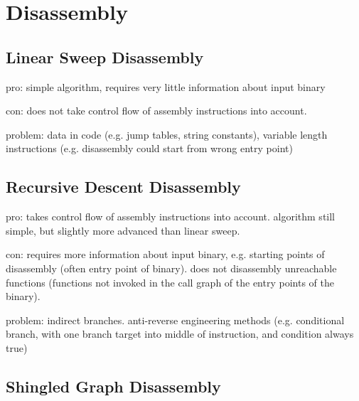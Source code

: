 

\section{Disassembly}


\subsection{Linear Sweep Disassembly}

pro: simple algorithm, requires very little information about input binary

con: does not take control flow of assembly instructions into account.

problem: data in code (e.g. jump tables, string constants), variable length instructions (e.g. disassembly could start from wrong entry point)



\subsection{Recursive Descent Disassembly}

pro: takes control flow of assembly instructions into account. algorithm still simple, but slightly more advanced than linear sweep.

con: requires more information about input binary, e.g. starting points of disassembly (often entry point of binary). does not disassembly unreachable functions (functions not invoked in the call graph of the entry points of the binary).

problem: indirect branches. anti-reverse engineering methods (e.g. conditional branch, with one branch target into middle of instruction, and condition always true)



\subsection{Shingled Graph Disassembly}

